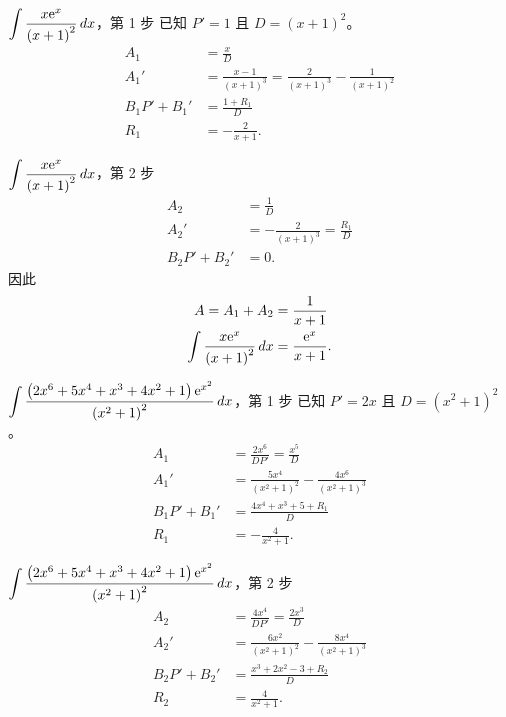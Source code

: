 \documentclass{beamer}
\newcommand{\e}{\textup e}
\theoremstyle{remark}
\begin{document}
\begin{CJK}{UTF8}{bsmi}
\begin{frame}{$\displaystyle \int \frac{x \e^x}{\left( x+1 \right)^2}\,dx$，第 1 步}
  已知 $P' = 1$ 且 $D = \left( x+1 \right)^2$。
  \begin{align*}
    A_1  &= \frac x D\\
    A_1' &= \frac{x-1}{\left( x+1 \right)^3} = \frac{2}{\left( x+1 \right)^3} - \frac{1}{\left( x+1 \right)^2}\\
    B_1 P' + B_1' &= \frac{1 + R_1}{D}\\
    R_1  &= -\frac{2}{x+1}.
  \end{align*}
\end{frame}

\begin{frame}{$\displaystyle \int \frac{x \e^x}{\left( x+1 \right)^2}\,dx$，第 2 步}
  \begin{align*}
    A_2  &= \frac1D\\
    A_2' &= -\frac{2}{\left( x+1 \right)^3} = \frac{R_1}{D}\\
    B_2 P' + B_2' &= 0.
  \end{align*}
  因此
  \begin{align*}
    A = A_1 + A_2 &= \frac{1}{x+1}\\
    \int \frac{x \e^x}{\left( x+1 \right)^2}\,dx &= \frac{\e^x}{x+1}.
  \end{align*}
\end{frame}

\begin{frame}{$\displaystyle \int \frac{\left( 2x^6 + 5x^4 + x^3 + 4x^2 + 1 \right) \e^{x^2}}{\left( x^2 + 1 \right)^2}
    \,dx$，第 1 步}
  已知 $P' = 2x$ 且 $D = \left( x^2 + 1 \right)^2$。
  \begin{align*}
    A_1  &= \frac{2x^6}{DP'} = \frac{x^5}{D}\\
    A_1' &= \frac{5x^4}{\left( x^2 + 1 \right)^2} - \frac{4x^6}{\left( x^2 + 1 \right)^3}\\
    B_1 P' + B_1' &= \frac{4x^4 + x^3 + 5 + R_1}{D}\\
    R_1  &= -\frac{4}{x^2 + 1}.
  \end{align*}
\end{frame}

\begin{frame}{$\displaystyle \int \frac{\left( 2x^6 + 5x^4 + x^3 + 4x^2 + 1 \right) \e^{x^2}}{\left( x^2 + 1 \right)^2}
    \,dx$，第 2 步}
  \begin{align*}
    A_2  &= \frac{4x^4}{DP'} = \frac{2x^3}{D}\\
    A_2' &= \frac{6x^2}{\left( x^2 + 1 \right)^2} - \frac{8x^4}{\left( x^2 + 1 \right)^3}\\
    B_2 P' + B_2' &= \frac{x^3 + 2x^2 - 3 + R_2}{D}\\
    R_2  &= \frac{4}{x^2 + 1}.
  \end{align*}
\end{frame}


\end{CJK}
\end{document}
